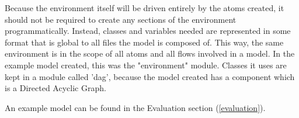 Because the environment itself will be driven entirely by the atoms created, it should not be required to create any sections of the environment programmatically. Instead, classes and variables needed are represented in some format that is global to all files the model is composed of. This way, the same environment is in the scope of all atoms and all flows involved in a model. In the example model created, this was the "environment" module. Classes it uses are kept in a module called 'dag', because the model created has a component which is a Directed Acyclic Graph. \par

An example model can be found in the Evaluation section (\cref{evaluation}). \par



